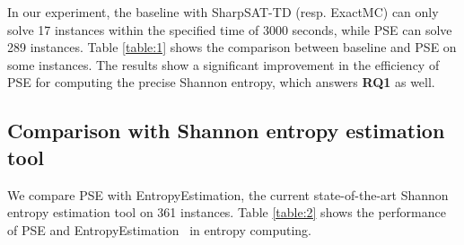 In our experiment, the baseline with SharpSAT-TD (resp. ExactMC) can only solve 17 instances within the specified time of 3000 seconds, while PSE can solve 289 instances. 
Table \ref{table:1} shows the comparison between baseline and PSE on some instances.
The results show a significant improvement in the efficiency of PSE for computing the precise Shannon entropy, which answers \textbf{RQ1} as well.

\subsection{Comparison with Shannon entropy estimation tool}
We compare PSE with EntropyEstimation, the current state-of-the-art Shannon entropy estimation tool on 361 instances. 
Table \ref{table:2} shows the performance of PSE and EntropyEstimation~\cite{golia2022scalable} in entropy computing.


